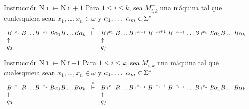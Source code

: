 \begin{frame}
	\begin{block}{Instrucción $\mathrm{N}\bar{\imath} \leftarrow \mathrm{N}\bar{\imath} + 1$}
		\PN Para $1 \leq i \leq k$, sea $M_{i,k}^{+}$ una máquina tal que cualesquiera sean $x_{1}, \dotsc, x_{n} \in
		\omega$ y $\alpha_{1}, \dotsc,\alpha_{m} \in \Sigma^{\ast}$
		\minLetter
		\[
			\begin{array}{lcl}
				B \shortmid^{x_{1}} B \dotsc B \shortmid^{x_{k}} B \alpha_{1} B \dotsc B \alpha_{k} &\overset{\ast}{\vdash}& B
				\shortmid^{x_{1}} B \dotsc B \shortmid^{x_{i-1}} B \shortmid^{x_{i}+1} B \shortmid^{x_{i+1}} \dotsc B
				\shortmid^{x_{k}} B \alpha_{1} B \dotsc B \alpha_{k} \\
				\uparrow && \uparrow \\
				q_{0} & & q_{f}
			\end{array}
		\]
	\end{block}

	\normLetter
	\begin{block}{Instrucción $\mathrm{N}\bar{\imath} \leftarrow \mathrm{N}\bar{\imath} \dot{-} 1$}
		\PN Para $1 \leq i \leq k$, sea $M_{i,k}^{\dot{-}}$ una máquina tal que cualesquiera sean $x_{1}, \dotsc, x_{n} \in
		\omega$ y $\alpha_{1}, \dotsc,\alpha_{m} \in \Sigma^{\ast}$
		\minLetter
		\[
			\begin{array}{lcl}
				B \shortmid^{x_{1}} B \dotsc B \shortmid^{x_{k}} B \alpha_{1} B \dotsc B \alpha_{k} &\overset{\ast}{\vdash}& B
					\shortmid^{x_{1}} B \dotsc B \shortmid^{x_{i-1}} B \shortmid^{x_{i} \dot{-} 1} B \shortmid^{x_{i+1}} \dotsc B
					\shortmid^{x_{k}} B \alpha_{1} B \dotsc B \alpha_{k} \\
				\uparrow && \uparrow \\
				q_{0} && q_{f}
			\end{array}
		\]
	\end{block}
\end{frame}
